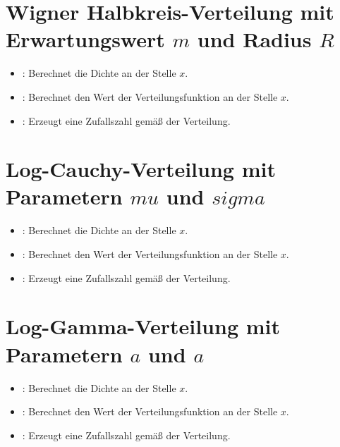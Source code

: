 \section{Wigner Halbkreis-Verteilung mit Erwartungswert \texorpdfstring{$m$}{m} und Radius \texorpdfstring{$R$}{R}}

\begin{itemize}

\item
{}:
Berechnet die Dichte an der Stelle $x$.

\item
{}:
Berechnet den Wert der Verteilungsfunktion an der Stelle $x$.

\item
{}:
Erzeugt eine Zufallszahl gemäß der Verteilung.

\end{itemize}



\section{Log-Cauchy-Verteilung mit Parametern \texorpdfstring{$mu$}{mu} und \texorpdfstring{$sigma$}{sigma}}

\begin{itemize}

\item
{}:
Berechnet die Dichte an der Stelle $x$.

\item
{}:
Berechnet den Wert der Verteilungsfunktion an der Stelle $x$.

\item
{}:
Erzeugt eine Zufallszahl gemäß der Verteilung.

\end{itemize}



\section{Log-Gamma-Verteilung mit Parametern \texorpdfstring{$a$}{a} und \texorpdfstring{$a$}{a}}

\begin{itemize}

\item
{}:
Berechnet die Dichte an der Stelle $x$.

\item
{}:
Berechnet den Wert der Verteilungsfunktion an der Stelle $x$.

\item
{}:
Erzeugt eine Zufallszahl gemäß der Verteilung.

\end{itemize}



